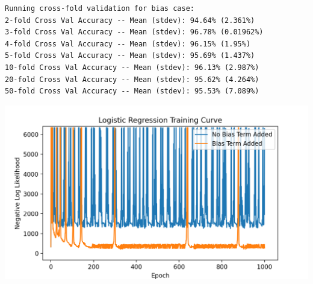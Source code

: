 \documentclass{article}
\theoremstyle{definition}
\begin{document}
\begin{mdframed}[]
    \begin{verbatim}
Running cross-fold validation for bias case:
2-fold Cross Val Accuracy -- Mean (stdev): 94.64% (2.361%)
3-fold Cross Val Accuracy -- Mean (stdev): 96.78% (0.01962%)
4-fold Cross Val Accuracy -- Mean (stdev): 96.15% (1.95%)
5-fold Cross Val Accuracy -- Mean (stdev): 95.69% (1.437%)
10-fold Cross Val Accuracy -- Mean (stdev): 96.13% (2.987%)
20-fold Cross Val Accuracy -- Mean (stdev): 95.62% (4.264%)
50-fold Cross Val Accuracy -- Mean (stdev): 95.53% (7.089%)
    \end{verbatim}
    \includegraphics[scale=0.75]{figures/step_size_1.png}
\end{mdframed}
\end{document}
